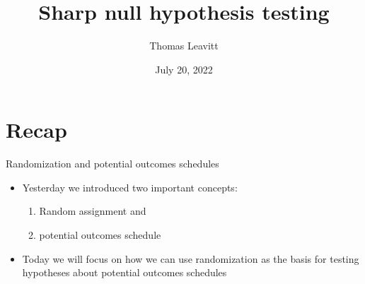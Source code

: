 \documentclass[table, xcolor = {dvipsnames}, 9pt]{beamer}
\title[]{Sharp null hypothesis testing} %
\author{Thomas Leavitt} %
\institute[] %
{
\medskip
\textit{} %
}
\date{July 20, 2022} %
\theoremstyle{plain}
\begin{document}
\begin{frame}
\titlepage %
\end{frame}


\section{Recap}
\begin{frame}{Randomization and potential outcomes schedules}
\vfill
\begin{itemize}
\item Yesterday we introduced two important concepts: \vfill
\begin{enumerate}
\item Random assignment and \vfill
\item potential outcomes schedule \vfill
\end{enumerate}
\item Today we will focus on how we can use randomization as the basis for testing hypotheses about potential outcomes schedules
\end{itemize} \vfill
\end{frame}
\end{document}
